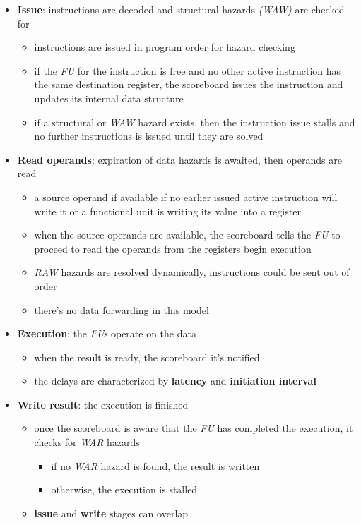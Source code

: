 \documentclass[english]{article}
\begin{document}
\begin{itemize}
  \item \textbf{Issue}: instructions are decoded and structural hazards \textit{(WAW)} are checked for
        \begin{itemize}
          \item instructions are issued in program order for hazard checking
          \item if the \textit{FU} for the instruction is free and no other active instruction has the same destination register, the scoreboard issues the instruction and updates its internal data structure
          \item if a structural or \textit{WAW} hazard exists, then the instruction issue stalls and no further instructions is issued until they are solved
        \end{itemize}
  \item \textbf{Read operands}: expiration of data hazards is awaited, then operands are read
        \begin{itemize}
          \item a source operand if available if no earlier issued active instruction will write it or a functional unit is writing its value into a register
          \item when the source operands are available, the scoreboard tells the \textit{FU} to proceed to read the operands from the registers begin execution
          \item \textit{RAW} hazards are resolved dynamically, instructions could be sent out of order
          \item there's no data forwarding in this model
        \end{itemize}
  \item \textbf{Execution}: the \textit{FUs} operate on the data
        \begin{itemize}
          \item when the result is ready, the scoreboard it's notified
          \item the delays are characterized by \textbf{latency} and \textbf{initiation interval}
        \end{itemize}
  \item \textbf{Write result}: the execution is finished
        \begin{itemize}
          \item once the scoreboard is aware that the \textit{FU} has completed the execution, it checks for \textit{WAR} hazards
                \begin{itemize}
                  \item if no \textit{WAR} hazard is found, the result is written
                  \item otherwise, the execution is stalled
                \end{itemize}
          \item \textbf{issue} and \textbf{write} stages can overlap
        \end{itemize}
\end{itemize}
\end{document}
